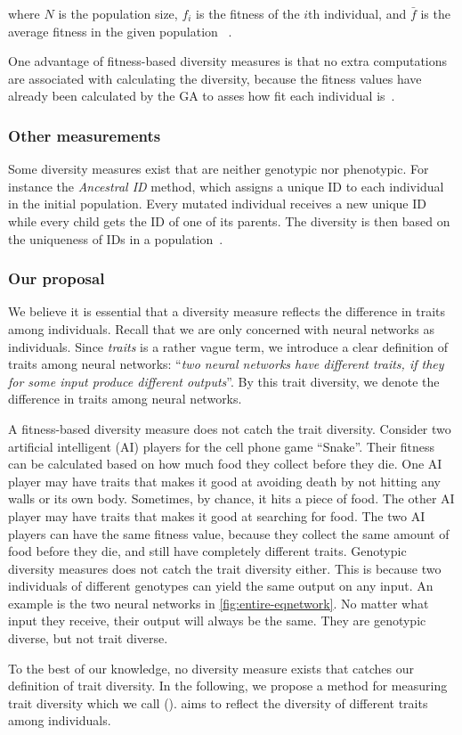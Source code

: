 where $N$ is the population size, $f_i$ is the fitness of the $i$th individual, and $\bar{f}$ is the average fitness in the given population ~\cite{1250187}.


One advantage of fitness-based diversity measures is that no extra computations are associated with calculating the diversity, because the fitness values have already been calculated by the GA to asses how fit each individual is~\cite{Nguyen:2006:ASPGP}.

\subsubsection{Other measurements}
Some diversity measures exist that are neither genotypic nor phenotypic. For instance the \emph{Ancestral ID} method, which assigns a unique ID to each individual in the initial population.
Every mutated individual receives a new unique ID while every child gets the ID of one of its parents.
The diversity is then based on the uniqueness of IDs in a population~\cite{1250187}.

\subsubsection{Our proposal}
We believe it is essential that a diversity measure reflects the difference in traits among individuals.
Recall that we are only concerned with neural networks as individuals. 
Since \emph{traits} is a rather vague term, we introduce a clear definition of traits among neural networks: ``\emph{two neural networks have different traits, if they for some input produce different outputs}''. By this trait diversity, we denote the difference in traits among neural networks.

A fitness-based diversity measure does not catch the trait diversity. Consider two artificial intelligent (AI) players for the cell phone game ``Snake''. Their fitness can be calculated based on how much food they collect before they die. One AI player may have traits that makes it good at avoiding death by not hitting any walls or its own body. Sometimes, by chance, it hits a piece of food. The other AI player may have traits that makes it good at searching for food. The two AI players can have the same fitness value, because they collect the same amount of food before they die, and still have completely different traits.
Genotypic diversity measures does not catch the trait diversity either. This is because two individuals of different genotypes can yield the same output on any input. An example is the two neural networks in \cref{fig:entire-eqnetwork}. No matter what input they receive, their output will always be the same. They are genotypic diverse, but not trait diverse.

%

%

To the best of our knowledge, no diversity measure exists that catches our definition of trait diversity.
In the following, we propose a method for measuring trait diversity which we call \emph{\di{}} (\dia{}). 
\dia{} aims to reflect the diversity of different traits among individuals. 
